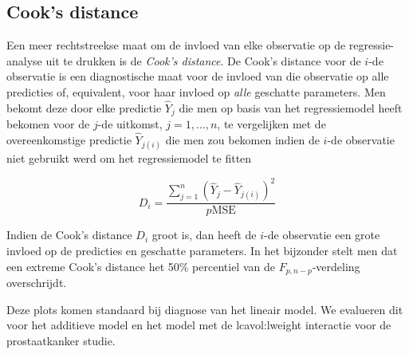 \documentclass[
  12pt,dutch]{book}
\theoremstyle{definition}
\theoremstyle{definition}
\theoremstyle{definition}
\theoremstyle{definition}
\theoremstyle{remark}
\begin{document}
\subsection{Cook's distance}\label{cooks-distance}

Een meer rechtstreekse maat om de invloed van elke observatie op de regressie-analyse uit te drukken is de \emph{Cook's distance}. De Cook's distance voor de \(i\)-de observatie is een diagnostische maat voor de invloed van die observatie op alle predicties of, equivalent, voor haar invloed op \emph{alle} geschatte parameters. Men bekomt deze door elke predictie \(\hat{Y}_j\) die men op basis van het regressiemodel heeft bekomen voor de \(j\)-de uitkomst, \(j=1,...,n\), te vergelijken met de overeenkomstige predictie \(\hat{Y}_{j(i)}\) die men zou bekomen indien de \(i\)-de observatie niet gebruikt werd om het regressiemodel te fitten

\[
D_i=\frac{\sum_{j=1}^n(\hat{Y}_j-\hat{Y}_{j(i)})^2}{p\textrm{MSE}}
\]

Indien de Cook's distance \(D_i\) groot is, dan heeft de \(i\)-de observatie een grote invloed op de predicties en geschatte parameters. In het bijzonder stelt men dat een extreme Cook's distance het 50\% percentiel van de \(F_{p,n-p}\)-verdeling overschrijdt.

Deze plots komen standaard bij diagnose van het lineair model.
We evalueren dit voor het additieve model en het model met de lcavol:lweight interactie voor de prostaatkanker studie.
\end{document}
